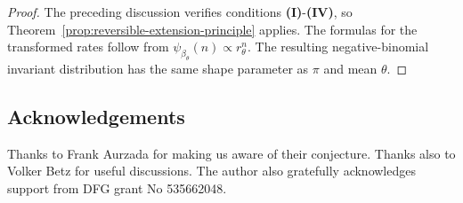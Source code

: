 \documentclass[11pt,reqno]{amsart}
\theoremstyle{definition}
\numberwithin{equation}{section}
\newcommand{\<}{\langle}
\renewcommand{\>}{\rangle}
\begin{document}
\begin{proof}
The preceding discussion verifies conditions
\textbf{(I)}-\textbf{(IV)}, so
Theorem~\ref{prop:reversible-extension-principle} applies.
The formulas for the transformed rates follow from
$\psi_{\beta_\theta}(n)\propto r_\theta^n$.  The resulting
negative-binomial invariant distribution has the same shape parameter as
$\pi$ and mean $\theta$.
\end{proof}

\subsection*{Acknowledgements}
Thanks to Frank Aurzada for making us aware of their conjecture. Thanks also to Volker Betz for useful discussions. The author also gratefully acknowledges support from DFG grant No 535662048.
\end{document}
